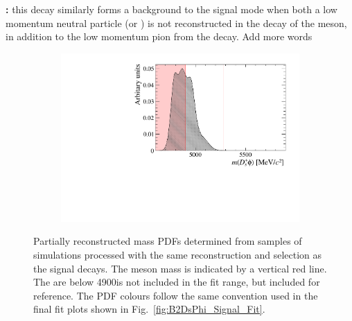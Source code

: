 \begin{description}
\item \textbf{\decay{\Bsb}{\Dssp\Km\Kstarz}:} this decay similarly forms a background to the signal mode when both a low momentum neutral particle (\piz or \Pgamma) is not reconstructed in the decay of the \Dssp meson, in addition to the low momentum pion from the \Kstarz decay. {\color{Red} Add more words}
\end{description}

\begin{figure}[!h]
    \centering
    \begin{subfigure}[t]{0.49\textwidth}
        \includegraphics[width=1.0\textwidth]{figs/B2DsPhi/Bs2DsstKKst_4600_5900_Shape.pdf}
    \end{subfigure}
    \caption{Partially reconstructed mass PDFs determined from samples of \decay{\Bsb}{\Dssp\Km\Kstarz} simulations processed with the same reconstruction and selection as the signal decays. The \Bp meson mass is indicated by a vertical red line. The are below 4900\mevcc is not included in the fit range, but included for reference. The PDF colours follow the same convention used in the final fit plots shown in Fig.~\ref{fig:B2DsPhi_Signal_Fit}.}
    \label{fig:B2DsPhi_part_reco_shapes_DsKKstar}   
\end{figure}

